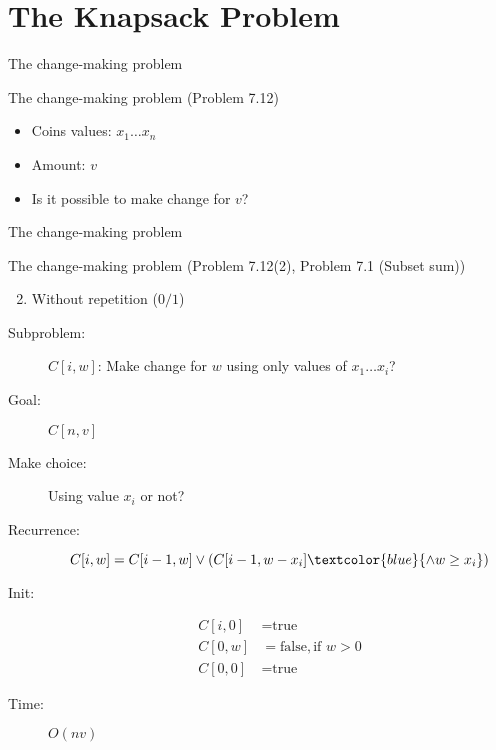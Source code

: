 \section{The Knapsack Problem}

\begin{frame}{The change-making problem}
  \begin{exampleblock}{The change-making problem (Problem 7.12)}
    \begin{itemize}
      \item Coins values: $x_{1} \dots x_{n}$
      \item Amount: $v$
      \item Is it possible to make change for $v$?
    \end{itemize}
  \end{exampleblock}
\end{frame}
\begin{frame}{The change-making problem}
  \begin{exampleblock}{The change-making problem (Problem 7.12(2), Problem 7.1 (Subset sum))}
	\begin{enumerate}[(1)]
	  \setcounter{enumi}{1}
	  \item Without repetition ($0/1$)
	\end{enumerate}
  \end{exampleblock}

  \pause
  \begin{description}
	\item[Subproblem:] $C[i, w]$: Make change for $w$ using only values of $x_{1} \dots x_{i}$?
	\item[Goal:] $C[n,v]$
	  \pause
	\item[Make choice:] Using value $x_{i}$ or not?
	\item[Recurrence:] 
	  \[
		C[i,w] = C[i-1, w] \lor (C[i-1, w-x_{i}] \textcolor{blue}{\land w \ge x_{i}})
	  \]
	  \pause
	\item[Init:]
	  \begin{align*}
		C[i,0] &= \text{true}  \\
		C[0,w] &= \text{false}, \text{if } w > 0 \\
		C[0,0] &= \text{true}
	  \end{align*}
	\item[Time:] $O(nv)$
  \end{description}
\end{frame}
